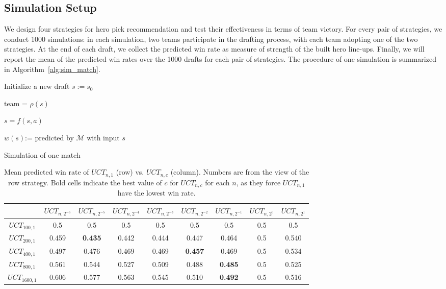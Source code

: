 \subsection{Simulation Setup}
We design four strategies for hero pick recommendation and test their effectiveness in terms of team victory. For every pair of strategies, we conduct 1000 simulations: in each simulation, two teams participate in the drafting process, with each team adopting one of the two strategies. At the end of each draft, we collect the predicted win rate as measure of strength of the built hero line-ups. Finally, we will report the mean of the predicted win rates over the 1000 drafts for each pair of strategies. The procedure of one simulation is summarized in Algorithm~\ref{alg:sim_match}.

\begin{algorithm}
    \BlankLine
    Initialize a new draft $s:= s_{0}$ 
    \BlankLine
     {
    team = $\rho(s)$
    
    
    
    $s = f(s,a)$
    }
    
    $w(s)$:= predicted by $\mathcal{M}$ with input $s$
    \caption{Simulation of one match}
    \label{alg:sim_match}
\end{algorithm}

\begin{table}
  \caption{Mean predicted win rate of $UCT_{n, 1}$ (row) vs. $UCT_{n, c}$ (column). Numbers are from the view of the row strategy. Bold cells indicate the best value of $c$ for $UCT_{n,c}$ for each $n$, as they force $UCT_{n,1}$ have the lowest win rate.}
  \label{tab:param_set}
  \centering
  \begin{tabular}{ccccccccc}
    \toprule
      & $UCT_{n,2^{-6}}$ & $UCT_{n, 2^{-5}}$ & $UCT_{n, 2^{-4}}$ & $UCT_{n, 2^{-3}}$ & $UCT_{n, 2^{-2}}$ & $UCT_{n, 2^{-1}}$ & $UCT_{n, 2^0}$ & $UCT_{n, 2^1}$\\
    \midrule
    $UCT_{100, 1}$ & 0.5 & 0.5 & 0.5 & 0.5 & 0.5 & 0.5 & 0.5 & 0.5\\
    $UCT_{200, 1}$ & 0.459 & \textbf{0.435} & 0.442 & 0.444 & 0.447 & 0.464 & 0.5 & 0.540 \\
    $UCT_{400, 1}$ & 0.497 & 0.476 & 0.469 & 0.469 & \textbf{0.457} & 0.469 & 0.5 & 0.534 \\
    $UCT_{800, 1}$ & 0.561 & 0.544 & 0.527 & 0.509 & 0.488 & \textbf{0.485} & 0.5 & 0.525 \\
    $UCT_{1600, 1}$ & 0.606 & 0.577 & 0.563 & 0.545 & 0.510 & \textbf{0.492} & 0.5 & 0.516 \\
  \bottomrule
\end{tabular}
\end{table}


